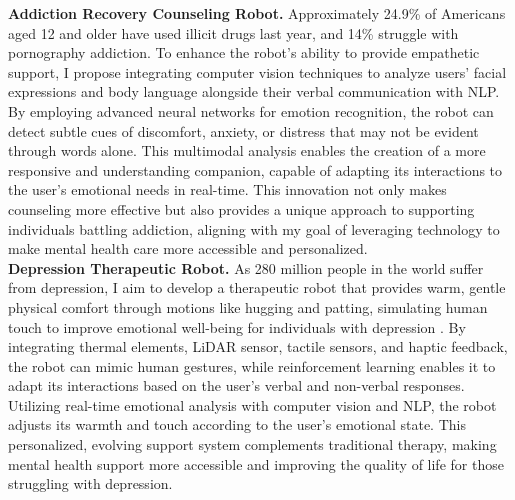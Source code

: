 \documentclass{article}
\begin{document}
\textbf{Addiction Recovery Counseling Robot.} Approximately 24.9\% of Americans aged 12 and older have used illicit drugs last year, and 14\% struggle with pornography addiction\cite{health}. To enhance the robot's ability to provide empathetic support, I propose integrating computer vision techniques to analyze users' facial expressions and body language alongside their verbal communication with NLP. By employing advanced neural networks for emotion recognition, the robot can detect subtle cues of discomfort, anxiety, or distress that may not be evident through words alone. This multimodal analysis enables the creation of a more responsive and understanding companion, capable of adapting its interactions to the user's emotional needs in real-time. This innovation not only makes counseling more effective but also provides a unique approach to supporting individuals battling addiction, aligning with my goal of leveraging technology to make mental health care more accessible and personalized.
\\

\textbf{Depression Therapeutic Robot.} As 280 million people in the world suffer from depression, I aim to develop a therapeutic robot that provides warm, gentle physical comfort through motions like hugging and patting, simulating human touch to improve emotional well-being for individuals with depression \cite{depression}. By integrating thermal elements, LiDAR sensor, tactile sensors, and haptic feedback, the robot can mimic human gestures, while reinforcement learning enables it to adapt its interactions based on the user's verbal and non-verbal responses. Utilizing real-time emotional analysis with computer vision and NLP, the robot adjusts its warmth and touch according to the user's emotional state. This personalized, evolving support system complements traditional therapy, making mental health support more accessible and improving the quality of life for those struggling with depression.
\\
\end{document}
